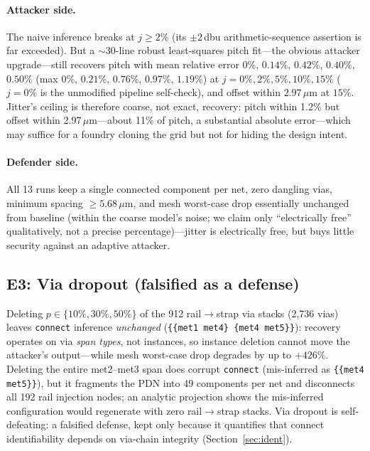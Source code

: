 \documentclass[11pt]{article}
\begin{document}
\paragraph{Attacker side.} The naive inference breaks at $j \geq 2\%$
(its $\pm 2$\,dbu arithmetic-sequence assertion is far exceeded).  But a
$\sim$30-line robust least-squares pitch fit---the obvious attacker
upgrade---still recovers pitch with mean relative error $0\%$,
$0.14\%$, $0.42\%$, $0.40\%$, $0.50\%$ (max $0\%$, $0.21\%$, $0.76\%$,
$0.97\%$, $1.19\%$) at $j = 0\%, 2\%, 5\%, 10\%, 15\%$ ($j=0\%$ is the
unmodified pipeline self-check), and offset within
$2.97\,\mu\mathrm{m}$ at $15\%$.  Jitter's ceiling is therefore coarse,
not exact, recovery: pitch within 1.2\% but offset within
2.97\,$\mu$m---about 11\% of pitch, a substantial absolute
error---which may suffice for a foundry cloning the grid but not for
hiding the design intent.

\paragraph{Defender side.} All 13 runs keep a single connected component
per net, zero dangling vias, minimum spacing $\geq 5.68\,\mu\mathrm{m}$,
and mesh worst-case drop essentially unchanged from baseline (within the
coarse model's noise; we claim only ``electrically free'' qualitatively,
not a precise percentage)---jitter is electrically free, but buys little security against an adaptive attacker.

\subsection{E3: Via dropout (falsified as a defense)}

Deleting $p \in \{10\%, 30\%, 50\%\}$ of the 912 rail$\to$strap via
stacks (2,736 vias) leaves \texttt{connect} inference \emph{unchanged}
(\texttt{\{\{met1 met4\} \{met4 met5\}\}}): recovery operates on via
\emph{span types}, not instances, so instance deletion cannot move the
attacker's output---while mesh worst-case drop degrades by up to
$+426\%$.  Deleting the entire met2--met3 span does corrupt
\texttt{connect} (mis-inferred as \texttt{\{\{met4 met5\}\}}), but it
fragments the PDN into 49 components per net and disconnects all 192
rail injection nodes; an analytic projection shows the mis-inferred
configuration would regenerate with zero rail$\to$strap stacks.  Via
dropout is self-defeating: a falsified defense, kept only because it
quantifies that connect identifiability depends on via-chain integrity
(Section~\ref{sec:ident}).
\end{document}
